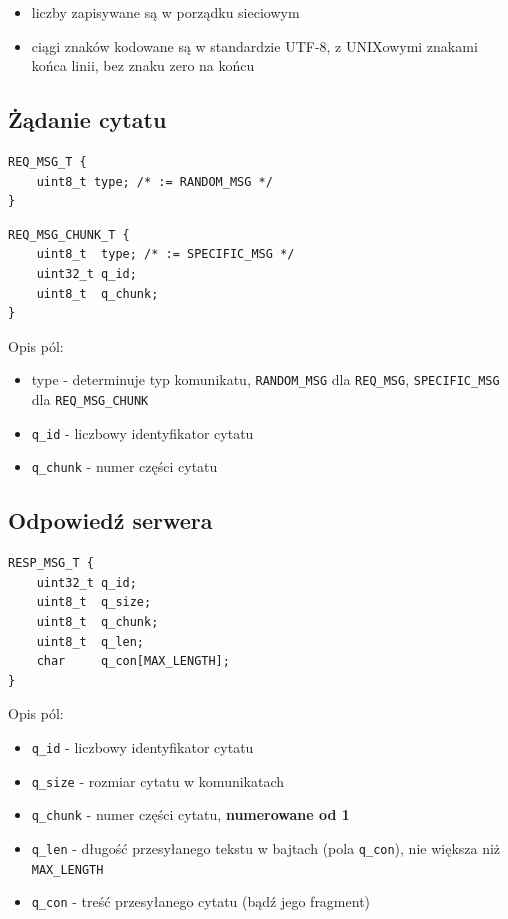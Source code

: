 \documentclass[a4paper,11pt,titlepage]{article}
\begin{document}
\begin{itemize}
\item liczby zapisywane są w porządku sieciowym
\item ciągi znaków kodowane są w standardzie UTF-8, z UNIXowymi znakami końca linii, bez znaku zero na końcu
\end{itemize}

\subsection{Żądanie cytatu}

\begin{verbatim}
REQ_MSG_T {
    uint8_t type; /* := RANDOM_MSG */
}
\end{verbatim}

\begin{verbatim}
REQ_MSG_CHUNK_T {
    uint8_t  type; /* := SPECIFIC_MSG */
    uint32_t q_id;
    uint8_t  q_chunk;
}
\end{verbatim}

Opis pól:
\begin{itemize}
\item type - determinuje typ komunikatu, \texttt{RANDOM\_MSG} dla \texttt{REQ\_MSG}, \texttt{SPECIFIC\_MSG} dla
      \texttt{REQ\_MSG\_CHUNK}
\item \texttt{q\_id} - liczbowy identyfikator cytatu
\item \texttt{q\_chunk} - numer części cytatu
\end{itemize}

\subsection{Odpowiedź serwera}

\begin{verbatim}
RESP_MSG_T {
    uint32_t q_id;
    uint8_t  q_size;
    uint8_t  q_chunk;
    uint8_t  q_len;
    char     q_con[MAX_LENGTH];
}
\end{verbatim}

Opis pól:
\begin{itemize}
\item \texttt{q\_id} - liczbowy identyfikator cytatu
\item \texttt{q\_size} - rozmiar cytatu w komunikatach
\item \texttt{q\_chunk} - numer części cytatu, {\bf numerowane od 1}
\item \texttt{q\_len} - długość przesyłanego tekstu w bajtach (pola \texttt{q\_con}), nie większa niż \texttt{MAX\_LENGTH}
\item \texttt{q\_con} - treść przesyłanego cytatu (bądź jego fragment)
\end{itemize}
\end{document}
